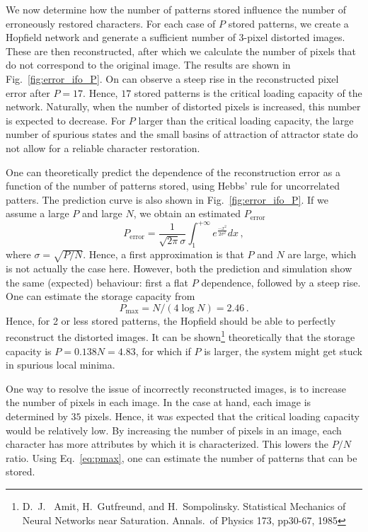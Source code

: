 \documentclass[pdftex,11pt,a4paper]{article}
\begin{document}
We now determine how the number of patterns stored influence the number of erroneously restored characters. For each case of $P$ stored patterns, we create a Hopfield network and generate a sufficient number of 3-pixel distorted images. These are then reconstructed, after which we calculate the number of pixels that do not correspond to the original image. The results are shown in Fig.~\ref{fig:error_ifo_P}. On can observe a steep rise in the reconstructed pixel error after $P=17$. Hence, $17$ stored patterns is the critical loading capacity of the network. Naturally, when the number of distorted pixels is increased, this number is expected to decrease. For $P$ larger than the critical loading capacity, the large number of spurious states and the small basins of attraction of attractor state do not allow for a reliable character restoration.

One can theoretically predict the dependence of the reconstruction error as a function of the number of patterns stored, using Hebbs' rule for uncorrelated patters. The prediction curve is also shown in Fig.~\ref{fig:error_ifo_P}. If we assume a large $P$ and large $N$, we obtain an estimated $P_{\textrm{error}}$
\begin{equation}
P_{\textrm{error}} = \frac{1}{\sqrt{2 \pi} \sigma} \int_{1}^{+\infty} e^{\frac{-x^2}{2 \sigma^2}} dx \,,
\end{equation}
where $\sigma=\sqrt{P/N}$. Hence, a first approximation is that $P$ and $N$ are large, which is not actually the case here. However, both the prediction and simulation show the same (expected) behaviour: first a flat $P$ dependence, followed by a steep rise. One can estimate the storage capacity from
\begin{equation}\label{eq:pmax}
P_{\max} = N/(4 \log N) =2.46 \,.
\end{equation}
Hence, for 2 or less stored patterns, the Hopfield should be able to perfectly reconstruct the distorted images. It can be shown\footnote{D.~J.~  Amit,  H.~Gutfreund,  and  H.~Sompolinsky.  Statistical  Mechanics  of  Neural  Networks  near Saturation. Annals.~of Physics 173, pp30-67, 1985} theoretically that the storage capacity is $P = 0.138 N=4.83$, for which if $P$ is larger, the system might get stuck in spurious local minima.

One way to resolve the issue of incorrectly reconstructed images, is to increase the number of pixels in each  image. In the case at hand, each image is determined by $35$ pixels. Hence, it was expected that the critical loading capacity would be relatively low. By increasing the number of pixels in an image, each character has more attributes by which it is characterized. This lowers the $P/N$ ratio. Using Eq.~\eqref{eq:pmax}, one can estimate the number of patterns that can be stored.
\end{document}

